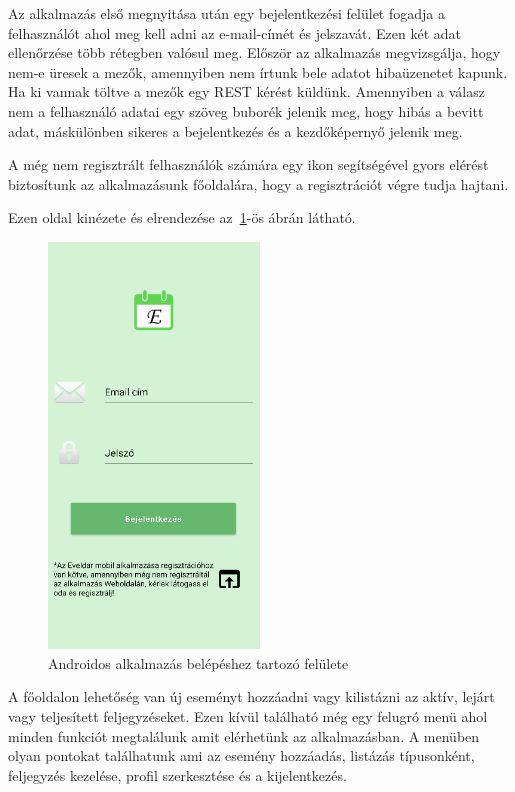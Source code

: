 \documentclass[
]{thesis-ekf}
\theoremstyle{definition}
\theoremstyle{remark}
\begin{document}
	Az alkalmazás első megnyitása után egy bejelentkezési felület fogadja a felhasználót ahol meg kell adni az e-mail-címét és jelszavát. Ezen két adat ellenőrzése több rétegben valósul meg. Először az alkalmazás megvizsgálja, hogy nem-e üresek a mezők, amennyiben nem írtunk bele adatot hibaüzenetet kapunk. Ha ki vannak töltve a mezők egy REST kérést küldünk. Amennyiben a válasz nem a felhasználó adatai egy szöveg buborék jelenik meg, hogy hibás a bevitt adat, máskülönben sikeres a bejelentkezés és a kezdőképernyő jelenik meg.
	
	A még nem regisztrált felhasználók számára egy ikon segítségével gyors elérést biztosítunk az alkalmazásunk főoldalára, hogy a regisztrációt végre tudja hajtani.
	
	Ezen oldal kinézete és elrendezése az~\ref{figure:androidapp_main}-ös ábrán látható.
	
	\begin{figure}[ht!]
		\centering
		\includegraphics[width=0.5\textwidth]{android_app/android_main}
		\caption{Androidos alkalmazás belépéshez tartozó felülete}
		\label{figure:androidapp_main}
	\end{figure}
	
	A főoldalon lehetőség van új eseményt hozzáadni vagy kilistázni az aktív, lejárt vagy teljesített feljegyzéseket. Ezen kívül található még egy felugró menü ahol minden funkciót megtalálunk amit elérhetünk az alkalmazásban. A menüben olyan pontokat találhatunk ami az esemény hozzáadás, listázás típusonként, feljegyzés kezelése, profil szerkesztése és a kijelentkezés. 
	
\end{document}
